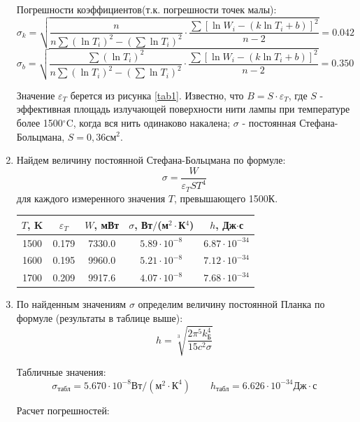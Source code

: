 \documentclass[a4paper,12pt]{article}
\begin{document}
\begin{enumerate}
    Погрешности коэффициентов(т.к. погрешности точек малы):
    $$
    \sigma_k = \sqrt{\frac{n}{n \sum (\ln T_i)^2 - (\sum \ln T_i)^2} \cdot \frac{\sum [\ln W_i - (k \ln T_i + b)]^2}{n-2}}=0.042
    $$
    $$
    \sigma_b = \sqrt{\frac{\sum (\ln T_i)^2}{n \sum (\ln T_i)^2 - (\sum \ln T_i)^2} \cdot \frac{\sum [\ln W_i - (k \ln T_i + b)]^2}{n-2}}=0.350
    $$

    \begin{center}
    \end{center}

    Значение $\varepsilon_T$ берется из рисунка \ref{tab1}. Известно, что $B = S \cdot \varepsilon_T$, где $S$ - эффективная площадь излучающей поверхности нити лампы при температуре более 1500$^\circ$C, когда вся нить одинаково накалена; $\sigma$ - постоянная Стефана-Больцмана, $S=0,36\text{см}^2$.

    \item Найдем величину постоянной Стефана-Больцмана по формуле:
    $$
    \sigma = \frac{W}{\varepsilon_T S T^4}
    $$
    для каждого измеренного значения $T$, превышающего 1500К.

    \begin{table}[h!]
    \centering
    \begin{tabular}{||c|c|c|c|c||}
    \hline
    $T$, K & $\varepsilon_T$ & $W$, мВт & $\sigma$, Вт$/$(м$^2\cdot$К$^4$) & $h$, Дж$\cdot$с\\
    \hline
    1500 & 0.179 & 7330.0 & $5.89 \cdot 10^{-8}$ & $6.87 \cdot 10^{-34}$ \\
    \hline
    1600 & 0.195 & 9960.0 & $5.21 \cdot 10^{-8}$ & $7.12 \cdot 10^{-34}$ \\
    \hline
    1700 & 0.209 & 9917.6 & $4.07 \cdot 10^{-8}$ & $7.68 \cdot 10^{-34}$ \\
    \hline
    \end{tabular}
    \end{table}

    \item По найденным значениям $\sigma$ определим величину постоянной Планка по формуле (результаты в таблице выше):
    $$
    h=\sqrt[3]{\frac{2\pi^5k_\text{Б}^4}{15c^2\sigma}}
    $$

    Табличные значения: 
    $$
    \sigma_\text{табл} = 5.670\cdot 10^{-8} \text{Вт}/(\text{м}^2\cdot\text{К}^4) \quad \quad h_\text{табл} = 6.626\cdot 10^{-34} \text{Дж}\cdot \text{с}
    $$
    
    Расчет погрешностей:


\end{enumerate}
\end{document}
